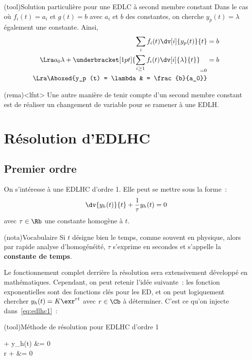 \documentclass[a4paper, 11pt, garamond]{book}
\begin{document}
\begin{tcn}(tool){Solution particulière pour une EDLC à second membre
			constant}
	Dans le cas où $f_i(t) = a_i$ et $g(t) = b$ avec $a_i$ et $b$ des
	constantes, on cherche $y_p (t) = \lambda$ également une constante. Ainsi,
	\begin{align*}
		\sum_{i} f_i(t) \dv[i]{y_p(t)}{t} & = b
		\\\Lra
		a_0 \lambda +
		\underbracket[1pt]{
			\sum_{i \geq 1} f_i(t) \dv[i]{\lambda}{t}
		}_{ =0}                           & = b
		\\\Lra
		\Aboxed{y_p (t) = \lambda         & = \frac{b}{a_0}}
	\end{align*}
\end{tcn}

\begin{tcn}(rema)<lfnt>{}
	Une autre manière de tenir compte d'un second membre constant est de réaliser
	un changement de variable pour se ramener à une EDLH.
\end{tcn}

\section{Résolution d'EDLHC}
\subsection{Premier ordre}
On s'intéresse à une EDLHC d'ordre 1. Elle peut se mettre sous la forme~:
\begin{equation}
	\dv{y_h(t)}{t} + \frac{1}{\tau} y_h(t) = 0
	\label{eq:edlhc1}
\end{equation}
avec $\tau \in \Rb$ une constante homogène à $t$.
\begin{tcn}(nota){Vocabulaire}
	Si $t$ désigne bien le temps, comme souvent en physique, alors par rapide
	analyse d'homogénéité, $\tau$ s'exprime en secondes et s'appelle la
	\textbf{constante de temps}.
\end{tcn}

Le fonctionnement complet derrière la résolution sera extensivement développé en
mathématiques. Cependant, on peut retenir l'idée suivante~: les fonction
exponentielles sont des fonctions clés pour les ED, et on peut logiquement
chercher $y_h(t) = K\exr^{rt}$ avec $r \in \Cb$ à déterminer. C'est ce qu'on
injecte dans~\eqref{eq:edlhc1}~:

\begin{tcn}(tool){Méthode de résolution pour EDLHC d'ordre 1}
  \begin{DispWithArrows*}
     +  y_h(t) &= 0
    \\\Ra 
    r \times {} +  &= 0
    \\\Lra
  \end{DispWithArrows*}
\end{tcn}
\end{document}

